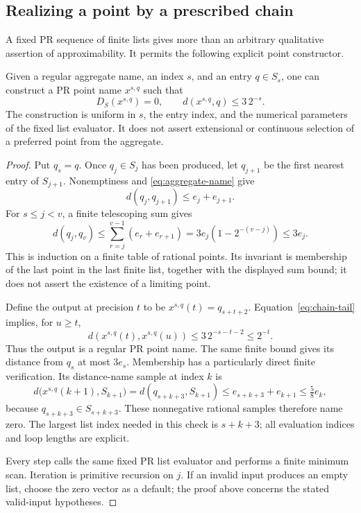 \subsection{Realizing a point by a prescribed chain}

A fixed PR sequence of finite lists gives more than an arbitrary
qualitative assertion of approximability. It permits the following
explicit point constructor.

\begin{theorem}\label{thm:aggregate-chain}
Given a regular aggregate name, an index $s$, and an entry $q\in S_s$,
one can construct a PR point name $x^{s,q}$ such that
\[
                  D_S(x^{s,q})=0,
                  \qquad d(x^{s,q},q)\le3\,2^{-s}.
\]
The construction is uniform in $s$, the entry index, and the numerical
parameters of the fixed list evaluator. It does not assert extensional
or continuous selection of a preferred point from the aggregate.
\end{theorem}

\begin{proof}
Put $q_s=q$. Once $q_j\in S_j$ has been produced, let $q_{j+1}$ be
the first nearest entry of $S_{j+1}$. Nonemptiness and
\eqref{eq:aggregate-name} give
\[
 d(q_j,q_{j+1})\le e_j+e_{j+1}.
\]
For $s\le j<v$, a finite telescoping sum gives
\[
 d(q_j,q_v)\le\sum_{r=j}^{v-1}(e_r+e_{r+1})
            =3e_j(1-2^{-(v-j)})\le3e_j.          \tag{C}\label{eq:chain-tail}
\]
This is induction on a finite table of rational points. Its invariant is
membership of the last point in the last finite list, together with the
displayed sum bound; it does not assert the existence of a limiting point.

Define the output at precision $t$ to be $x^{s,q}(t)=q_{s+t+2}$.
Equation~\eqref{eq:chain-tail} implies, for $u\ge t$,
\[
 d(x^{s,q}(t),x^{s,q}(u))\le3\,2^{-s-t-2}\le2^{-t}.
\]
Thus the output is a regular PR point name. The same finite bound gives
its distance from $q_s$ at most $3e_s$. Membership has a particularly
direct finite verification. Its distance-name sample at index $k$ is
\[
 d\bigl(x^{s,q}(k+1),S_{k+1}\bigr)
 =d(q_{s+k+3},S_{k+1})
 \le e_{s+k+3}+e_{k+1}\le\tfrac58 e_k,
\]
because $q_{s+k+3}\in S_{s+k+3}$. These nonnegative rational samples
therefore name zero. The largest list index needed in this check is
$s+k+3$; all evaluation indices and loop lengths are explicit.

Every step calls the same fixed PR list evaluator and performs a finite
minimum scan. Iteration is primitive recursion on $j$. If an invalid
input produces an empty list, choose the zero vector as a default; the
proof above concerns the stated valid-input hypotheses.
\end{proof}

